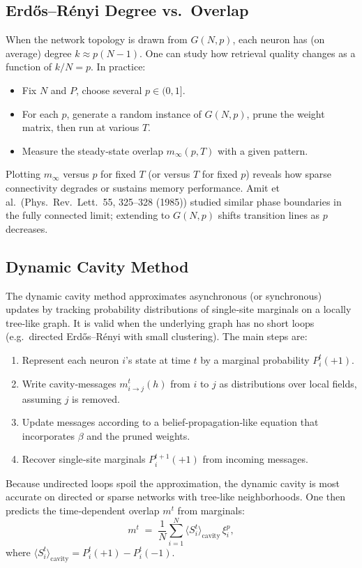 \documentclass{article}
\begin{document}
\subsection{Erdős–Rényi Degree vs.\ Overlap}
When the network topology is drawn from $G(N,p)$, each neuron has (on average) degree $k \approx p(N-1)$.  One can study how retrieval quality changes as a function of $k/N = p$.  In practice:
\begin{itemize}
    \item Fix $N$ and $P$, choose several $p\in(0,1]$.
    \item For each $p$, generate a random instance of $G(N,p)$, prune the weight matrix, then run at various $T$.
    \item Measure the steady‐state overlap $m_\infty(p,T)$ with a given pattern.
\end{itemize}
Plotting $m_\infty$ versus $p$ for fixed $T$ (or versus $T$ for fixed $p$) reveals how sparse connectivity degrades or sustains memory performance.  Amit et al.\ (Phys.\ Rev.\ Lett.\ 55, 325–328 (1985)) studied similar phase boundaries in the fully connected limit; extending to $G(N,p)$ shifts transition lines as $p$ decreases.

\subsection{Dynamic Cavity Method}
The dynamic cavity method approximates asynchronous (or synchronous) updates by tracking probability distributions of single‐site marginals on a locally tree‐like graph.  It is valid when the underlying graph has no short loops (e.g.\ directed Erdős–Rényi with small clustering).  The main steps are:
\begin{enumerate}
    \item Represent each neuron $i$'s state at time $t$ by a marginal probability $P_i^t(+1)$.
    \item Write cavity‐messages $m_{i\to j}^t(h)$ from $i$ to $j$ as distributions over local fields, assuming $j$ is removed.
    \item Update messages according to a belief‐propagation‐like equation that incorporates $\beta$ and the pruned weights.
    \item Recover single‐site marginals $P_i^{t+1}(+1)$ from incoming messages.
\end{enumerate}
Because undirected loops spoil the approximation, the dynamic cavity is most accurate on directed or sparse networks with tree‐like neighborhoods.  One then predicts the time‐dependent overlap $m^t$ from marginals:
\[
m^t \;=\; \frac{1}{N} \sum_{i=1}^N \langle S_i^t \rangle_{\mathrm{cavity}}\,\xi_i^p,
\]
where $\langle S_i^t \rangle_{\mathrm{cavity}} = P_i^t(+1) - P_i^t(-1)$.
\end{document}
